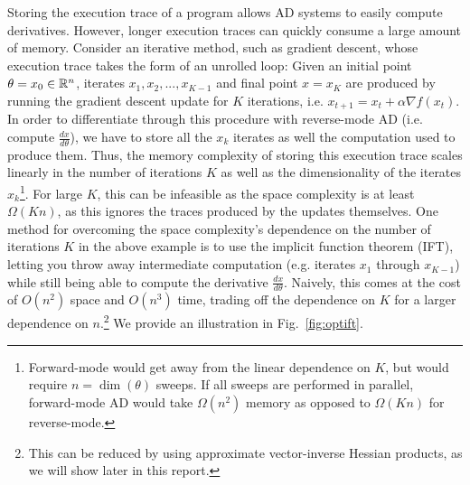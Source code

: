 \documentclass[11pt]{article}
\begin{document}
Storing the execution trace of a program allows AD systems to easily compute derivatives.
However, longer execution traces can quickly consume a large amount of memory.
Consider an iterative method, such as gradient descent,
whose execution trace takes the form of an unrolled loop:
Given an initial point $\theta = x_0\in\mathbb{R}^n$,
iterates $x_1, x_2, ..., x_{K-1}$ and final point $x=x_K$
are produced by running the gradient descent
update for $K$ iterations, i.e. $x_{t+1} = x_{t} + \alpha \nabla f(x_t)$.
In order to differentiate through this procedure with reverse-mode AD
(i.e. compute $\frac{dx}{d\theta}$),
we have to store all the $x_k$ iterates
as well the computation used to produce them.
Thus, the memory complexity of storing this execution trace scales linearly in the
number of iterations $K$ as well as the dimensionality of the iterates $x_k$\footnote{
Forward-mode would get away from the linear dependence on $K$,
but would require $n=\dim(\theta)$ sweeps.
If all sweeps are performed in parallel,
forward-mode AD would take $\Omega(n^2)$ memory as opposed to $\Omega(Kn)$ for reverse-mode.
}.
For large $K$, this can be infeasible as the space complexity is at least $\Omega(Kn)$,
as this ignores the traces produced by the updates themselves.
One method for overcoming the space complexity's dependence on the number of iterations $K$ in
the above example is to use the implicit function theorem (IFT),
letting you throw away intermediate computation (e.g. iterates $x_1$ through $x_{K-1}$)
while still being able to compute the derivative $\frac{dx}{d\theta}$.
Naively, this comes at the cost of $O(n^2)$ space and $O(n^3)$ time,
trading off the dependence on $K$ for a larger dependence on $n$.\footnote{
This can be reduced by using approximate vector-inverse Hessian products,
as we will show later in this report.
}
We provide an illustration in Fig.~\ref{fig:optift}.
\end{document}
